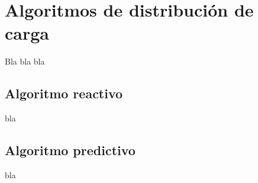 \chapter{Algoritmos de distribución de carga}
\label{cap:algoritmos}
Bla bla bla

\section{Algoritmo reactivo}
bla

\section{Algoritmo predictivo}
bla